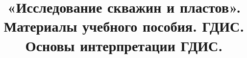 \documentclass{article}
\begin{document}
\title{«Исследование скважин и пластов». Материалы учебного пособия. ГДИС. Основы интерпретации ГДИС.}

\maketitle


\tableofcontents{}






\printbibliography
\end{document}
